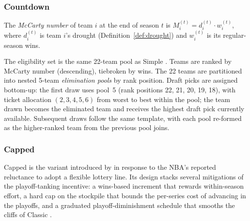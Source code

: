 \subsubsection{Countdown \cola{}}

\begin{definition}
\label{def:mccarty}
The \emph{McCarty number} of team $i$ at the end of season $t$ is $M_i^{(t)} = d_i^{(t)} \cdot w_i^{(t)}$, where $d_i^{(t)}$ is team $i$'s drought (Definition~\ref{def:drought}) and $w_i^{(t)}$ is its regular-season wins.
\end{definition}

\begin{definition}
\label{def:countdown-cola}
The eligibility set is the same 22-team pool as Simple \cola{}. Teams are ranked by McCarty number (descending), tiebroken by wins. The 22 teams are partitioned into nested 5-team \emph{elimination pools} by rank position. Draft picks are assigned bottom-up: the first draw uses pool~5 (rank positions 22, 21, 20, 19, 18), with ticket allocation $(2, 3, 4, 5, 6)$ from worst to best within the pool; the team drawn becomes the eliminated team and receives the highest draft pick currently available. Subsequent draws follow the same template, with each pool re-formed as the higher-ranked team from the previous pool joins.
\end{definition}


\subsubsection{Capped \cola{}}

Capped \cola{} is the variant introduced by \citet{highley2026solvable5} in response to the NBA's reported reluctance to adopt a flexible lottery line. Its design stacks several mitigations of the playoff-tanking incentive: a wins-based increment that rewards within-season effort, a hard cap on the stockpile that bounds the per-series cost of advancing in the playoffs, and a graduated playoff-diminishment schedule that smooths the cliffs of Classic \cola{}.


